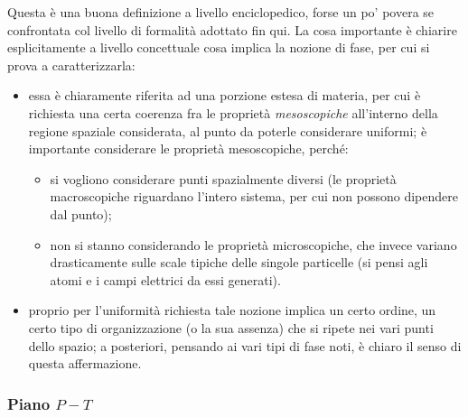 Questa è una buona definizione a livello enciclopedico, forse un po' povera se confrontata col livello di formalità adottato fin qui. La cosa importante è chiarire esplicitamente a livello concettuale cosa implica la nozione di fase, per cui si prova a caratterizzarla:

\begin{itemize}
	\item essa è chiaramente riferita ad una porzione estesa di materia, per cui è richiesta una certa coerenza fra le proprietà \textit{mesoscopiche} all'interno della regione spaziale considerata, al punto da poterle considerare uniformi; è importante considerare le proprietà mesoscopiche, perché:
	\begin{itemize}
		\item si vogliono considerare punti spazialmente diversi (le proprietà macroscopiche riguardano l'intero sistema, per cui non possono dipendere dal punto);
		\item non si stanno considerando le proprietà microscopiche, che invece variano drasticamente sulle scale tipiche delle singole particelle (si pensi agli atomi e i campi elettrici da essi generati).
	\end{itemize}
	\item proprio per l'uniformità richiesta tale nozione implica un certo ordine, un certo tipo di organizzazione (o la sua assenza) che si ripete nei vari punti dello spazio; a posteriori, pensando ai vari tipi di fase noti, è chiaro il senso di questa affermazione. 
\end{itemize}

\subsubsection{Piano $P-T$}


